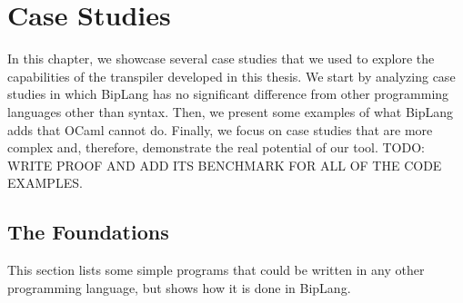 
%

\newcommand{\provername}[1]{\cellcolor{yellow!25}
\begin{sideways}\textbf{#1}~~\end{sideways}}
\newcommand{\explanation}[1]{\cellcolor{yellow!13}lemma \texttt{#1}}
\newcommand{\transformation}[1]{\cellcolor{yellow!13}transformation \texttt{#1}}
\newcommand{\subgoal}[2]{\cellcolor{yellow!13}subgoal #2}
\newcommand{\valid}[1]{\cellcolor{green!13}#1}
\newcommand{\unknown}[1]{\cellcolor{red!20}#1}
\newcommand{\invalid}[1]{\cellcolor{red!50}#1}
\newcommand{\timeout}[1]{\cellcolor{red!20}(#1)}
\newcommand{\outofmemory}[1]{\cellcolor{red!20}(#1)}
\newcommand{\noresult}{\multicolumn{1}{>{\columncolor[gray]{0.8}}c|}{~}}
\newcommand{\highfailure}{\cellcolor{red!50}FAILURE}


\chapter{Case Studies}
\label{cha:case_studies}

In this chapter, we showcase several case studies that we used to explore the capabilities of the transpiler developed in this thesis.
We start by analyzing case studies in which BipLang has no significant difference from other programming languages other than syntax.
Then, we present some examples of what BipLang adds that OCaml cannot do.
Finally, we focus on case studies that are more complex and, therefore, demonstrate the real potential of our tool.
TODO: WRITE PROOF AND ADD ITS BENCHMARK FOR ALL OF THE CODE EXAMPLES. 


\section{The Foundations}
\label{sec:foundations}

This section lists some simple programs that could be written in any other 
programming language, but shows how it is done in BipLang.

